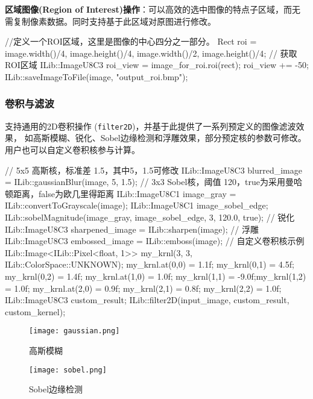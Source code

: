 \documentclass[11pt]{article}
\begin{document}
\textbf{区域图像(Region of Interest)操作}：可以高效的选中图像的特点子区域，而无需复制像素数据。同时支持基于此区域对原图进行修改。
\begin{commandline}
    //定义一个ROI区域，这里是图像的中心四分之一部分。
    Rect roi = {image.width()/4, image.height()/4, 
                image.width()/2, image.height()/4};
    // 获取ROI区域
    ILib::ImageU8C3 roi_view = image_for_roi.roi(rect); 
    roi_view += -50;
    ILib::saveImageToFile(image, "output_roi.bmp"); 
\end{commandline}


\subsubsection{卷积与滤波}
支持通用的2D卷积操作 (\texttt{filter2D})，并基于此提供了一系列预定义的图像滤波效果，
如高斯模糊、锐化、Sobel边缘检测和浮雕效果，部分预定核的参数可修改。用户也可以自定义卷积核参与计算。
\begin{commandline}
  // 5x5 高斯核，标准差 1.5，其中5，1.5可修改
  ILib::ImageU8C3 blurred_image = ILib::gaussianBlur(image, 5, 1.5);
  // 3x3 Sobel核，阈值 120，true为采用曼哈顿距离，false为欧几里得距离
  ILib::ImageU8C1 image_gray = ILib::convertToGrayscale(image);
  ILib::ImageU8C1 image_sobel_edge;
  ILib::sobelMagnitude(image_gray, image_sobel_edge, 3, 120.0, true);
  // 锐化
  ILib::ImageU8C3 sharpened_image = ILib::sharpen(image);
  // 浮雕
  ILib::ImageU8C3 embossed_image = ILib::emboss(image);
  // 自定义卷积核示例
  ILib::Image<ILib::Pixel<float, 1>> my_krnl(3, 3, ILib::ColorSpace::UNKNOWN);
  my_krnl.at(0,0) = {1.1f}; my_krnl(0,1) = {4.5f}; my_krnl(0,2) = {1.4f};
  my_krnl.at(1,0) = {1.0f}; my_krnl(1,1) = {-9.0f};my_krnl(1,2) = {1.0f}; 
  my_krnl.at(2,0) = {0.9f}; my_krnl(2,1) = {0.8f}; my_krnl(2,2) = {1.0f};
  ILib::ImageU8C3 custom_result;
  ILib::filter2D(input_image, custom_result, custom_kernel);
\end{commandline}

\begin{figure}[H]
  \centering
  \begin{minipage}[b]{0.49\textwidth}
    \centering
    \texttt{[image: gaussian.png]}
   \caption{高斯模糊}
    \label{fig:example}
  \end{minipage}
  \hfill %
  \begin{minipage}[b]{0.49\textwidth}
    \centering
    \texttt{[image: sobel.png]}
  \caption{Sobel边缘检测}
    \label{fig:example}
  \end{minipage}
\end{figure}
\end{document}
